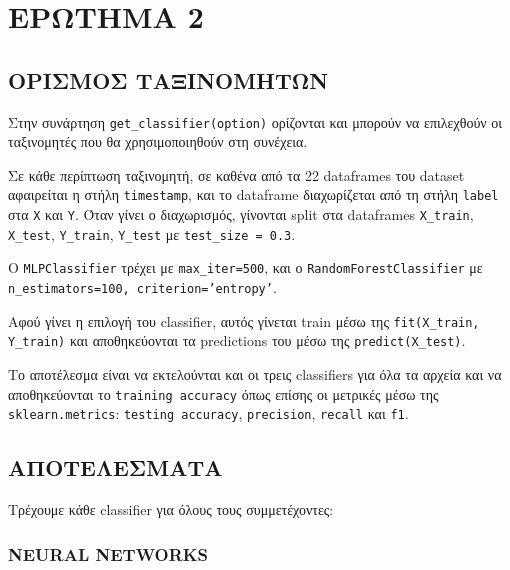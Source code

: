 \pagebreak
\chapter{ΕΡΩΤΗΜΑ 2}

    \section{ΟΡΙΣΜΟΣ ΤΑΞΙΝΟΜΗΤΩΝ}

    Στην συνάρτηση \verb|get_classifier(option)| ορίζονται και μπορούν να επιλεχθούν οι ταξινομητές που θα χρησιμοποιηθούν στη συνέχεια.

    Σε κάθε περίπτωση ταξινομητή, σε καθένα από τα 22 dataframes του dataset αφαιρείται η στήλη \texttt{timestamp},
    και το dataframe διαχωρίζεται από τη στήλη \texttt{label} στα \texttt{X} και \texttt{Y}. Όταν γίνει ο διαχωρισμός, γίνονται split
    στα dataframes \texttt{X\_train}, \texttt{X\_test}, \texttt{Y\_train}, \texttt{Y\_test} με \verb|test_size = 0.3|.

    Ο \texttt{MLPClassifier} τρέχει με \texttt{max\_iter=500}, και ο \texttt{RandomForestClassifier} με \texttt{n\_estimators=100, criterion='entropy'}.

    Αφού γίνει η επιλογή του classifier, αυτός γίνεται train μέσω της \verb|fit(X_train, Y_train)| και αποθηκεύονται τα predictions του μέσω της \verb|predict(X_test)|.

    Το αποτέλεσμα είναι να εκτελούνται και οι τρεις classifiers για όλα τα αρχεία και να αποθηκεύονται το \texttt{training accuracy}
    όπως επίσης οι μετρικές μέσω της \texttt{sklearn.metrics}: \texttt{testing accuracy}, \texttt{precision}, \texttt{recall} και \texttt{f1}.

    \section{ΑΠΟΤΕΛΕΣΜΑΤΑ}

        Τρέχουμε κάθε classifier για όλους τους συμμετέχοντες:

    \subsection{NEURAL NETWORKS}

